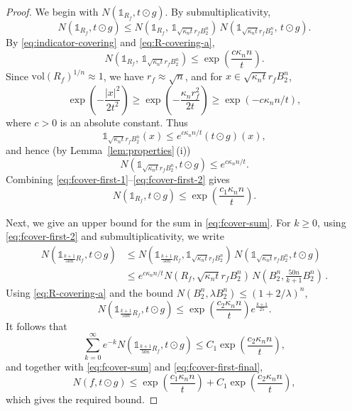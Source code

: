 \documentclass[10pt,a4paper]{amsart}
\newcommand{\gr}{\geqslant}
\newcommand{\ls}{\leqslant}
\newcommand{\vol}{\mathrm{vol}}
\begin{document}
\begin{proof}
We begin with $N(\mathds{1}_{R_f},t\odot g)$.
By submultiplicativity,
\begin{equation}\label{eq:fcover-first}
N(\mathds{1}_{R_f},t\odot g)\ls N(\mathds{1}_{R_f},\,\mathds{1}_{\sqrt{\kappa_nt}r_f B_2^n})
\,N(\mathds{1}_{\sqrt{\kappa_nt}r_f B_2^n},\,t\odot g).
\end{equation}
By \eqref{eq:indicator-covering} and \eqref{eq:R-covering-a},
\begin{equation}\label{eq:fcover-first-1}
N(\mathds{1}_{R_f},\,\mathds{1}_{\sqrt{\kappa_nt}r_f B_2^n})\ls \exp\!\left(\frac{c\kappa_n n}{t}\right).
\end{equation}
Since $\vol(R_f)^{1/n}\approx 1$, we have $r_f\approx\sqrt{n}$, and for $x\in \sqrt{\kappa_nt}r_f B_2^n$,
$$\exp\!\left(-\frac{|x|^2}{2t^2}\right)\gr\exp\left(-\frac{\kappa_nr_f^2}{2t}\right) 
\gr\exp(-c\kappa_nn/t),$$
where $c>0$ is an absolute constant. Thus
$$\mathds{1}_{\sqrt{\kappa_nt}r_f B_2^n}(x)\ls e^{c\kappa_nn/t}(t\odot g)(x),$$
and hence (by Lemma~\ref{lem:properties}\,(i))
\begin{equation}\label{eq:fcover-first-2}
N(\mathds{1}_{\sqrt{\kappa_nt}r_f B_2^n},t\odot g)\ls e^{c\kappa_nn/t}.
\end{equation}
Combining \eqref{eq:fcover-first-1}--\eqref{eq:fcover-first-2} gives
\begin{equation}\label{eq:fcover-first-final}
N(\mathds{1}_{R_f},t\odot g)\ls \exp\!\left(\frac{c_1\kappa_n n}{t}\right).
\end{equation}

Next, we give an upper bound for the sum in \eqref{eq:fcover-sum}. For $k\gr 0$, using \eqref{eq:fcover-first-2}
and submultiplicativity, we write
\begin{align*}N(\mathds{1}_{\frac{k+1}{50n}R_f},t\odot g) &\ls N(\mathds{1}_{\frac{k+1}{50n}R_f},\mathds{1}_{\sqrt{\kappa_nt}r_f B_2^n})
\,N(\mathds{1}_{\sqrt{\kappa_nt}r_f B_2^n},t\odot g)\\
&\ls e^{c\kappa_nn/t} N(R_f,\sqrt{\kappa_nt}r_f B_2^n)\,N\!\left(B_2^n,\tfrac{50n}{k+1}B_2^n\right)\,.
\end{align*}
Using \eqref{eq:R-covering-a} and the bound $N(B_2^n,\lambda B_2^n)\ls (1+2/\lambda)^n$,
$$N(\mathds{1}_{\frac{k+1}{50n}R_f},t\odot g)\ls \exp\!\left(\frac{c_2\kappa_n n}{t}\right)e^{\frac{k+1}{25}}.$$
It follows that
$$\sum_{k=0}^\infty e^{-k}N(\mathds{1}_{\frac{k+1}{50n}R_f},t\odot g)\ls 
C_1\exp\!\left(\frac{c_2\kappa_nn}{t}\right),$$
and together with \eqref{eq:fcover-sum} and \eqref{eq:fcover-first-final},
$$N(f,t\odot g)\ls \exp\!\left(\frac{c_1\kappa_n n}{t}\right)
+C_1\exp\!\left(\frac{c_2\kappa_n n}{t}\right),$$
which gives the required bound.
\end{proof}
\end{document}
